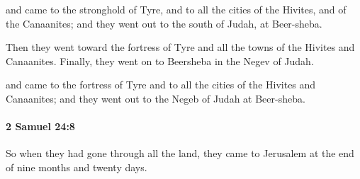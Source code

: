 			\begin{versebox}
					\item[BHS] 
					\item[ASV] and came to the stronghold of Tyre, and to all the cities of the Hivites, and of the Canaanites; and they went out to the south of Judah, at Beer-sheba.
					\item[NIV] Then they went toward the fortress of Tyre and all the towns of the Hivites and Canaanites. Finally, they went on to Beersheba in the Negev of Judah.
					\item[NRSV] and came to the fortress of Tyre and to all the cities of the Hivites and Canaanites; and they went out to the Negeb of Judah at Beer-sheba.
			\end{versebox}

		\paragraph{2 Samuel 24:8} %
			\label{2SAMUEL-24-8}

			So when they had gone through all the land, they came to Jerusalem at the end of nine months and twenty days.

